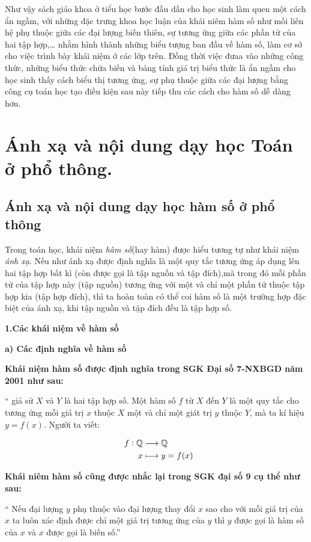 \documentclass[12pt,oneside,a4paper,reqno]{book}
\begin{document}
        Như vậy sách giáo khoa ở tiểu học bước đầu dần cho học sinh làm quen một cách ẩn ngầm, với những đặc trưng khoa học luận của khái niêm hàm số như mối liên hệ phụ thuộc giữa các đại lượng biến thiên, sự tương ứng giữa các phần tử của hai tập hợp,… nhằm hình thành những biểu tượng ban đầu về hàm số, làm cơ sở cho việc trình bày khái niệm ở các lớp trên. Đồng thời việc đưaa vào những công thức, những biểu thức chứa biến và bảng tính giá trị biểu thức là ẩn ngầm cho học sinh thấy cách biểu thị tương ứng, sự phụ thuộc giữa các đại lượng bằng công cụ toán học tạo điều kiện sau này tiếp thu các cách cho hàm số dễ dàng hơn.
        
\section{Ánh xạ và nội dung dạy học Toán ở phổ thông.}
\subsection{Ánh xạ và nội dung dạy học hàm số ở phổ thông}
Trong toán học, khái niệm \textit{hàm số}(hay hàm) được hiểu tương tự như khái niệm \textit{ánh xạ}. Nếu như ánh xạ được định nghĩa là một quy tắc tương ứng áp dụng lên hai tập hợp bất kì (còn được gọi là tập nguồn và tập đích),mà trong đó mỗi phần tử của tập hợp này (tập nguồn)  tương ứng với một và chỉ một phần tử thuộc tập hợp kia (tập hợp đích), thì ta hoàn toàn có thể coi hàm số là một trường hợp đặc biệt của ánh xạ, khi tập nguồn và tập đích đều là tập hợp số.

{\bf 1.Các khái niệm về hàm số}

{\bf a) Các định nghĩa về hàm số}

{\bf Khái niệm  hàm số được định nghĩa trong  SGK Đại số 7-NXBGD năm 2001 như sau:}

         “ giả sử $X$ và $Y$ là hai tập hợp số. Một hàm số $f$ từ $X$ đến $Y$ là một quy tắc cho tương ứng mỗi giá trị $x$ thuộc $X$ một và chỉ một giát trị $y$ thuộc $Y$, mà ta kí hiệu $y=f(x)$. Người ta viết:
         
\begin{align*}
\text{ \space}f:\mathbb{Q}&\longrightarrow\mathbb{Q}\\
x&\longmapsto y=f(x)  
\end{align*}


{\bf Khái niêm hàm số cũng được nhắc lại trong  SGK đại số 9 cụ  thể như sau:}

“ Nếu đại lượng $y$ phụ thuộc vào đại lượng thay đổi $x$  sao cho với mỗi giá trị của $x$ ta luôn xác định được chỉ một giá trị tương ứng của $y$ thì $y$ được gọi là hàm số của $x$ và $x$ được gọi là biến số.”
\end{document}
